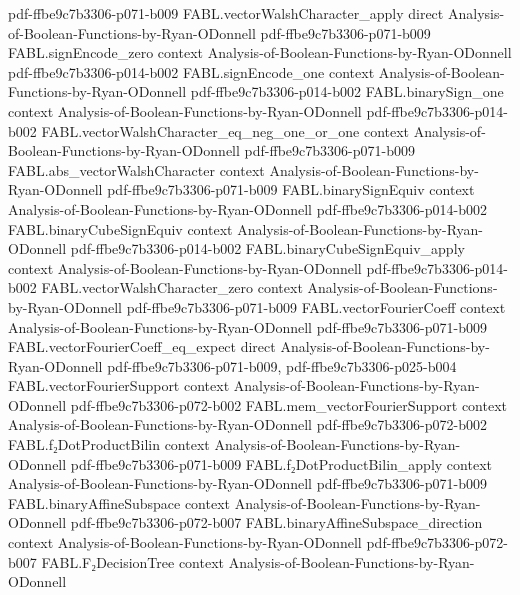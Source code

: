 \begin{theorem}
  {pdf-ffbe9c7b3306-p071-b009}
\proofstep
  {FABL.vectorWalshCharacter_apply}
  {direct}
  {Analysis-of-Boolean-Functions-by-Ryan-ODonnell}
  {pdf-ffbe9c7b3306-p071-b009}
\proofstep
  {FABL.signEncode_zero}
  {context}
  {Analysis-of-Boolean-Functions-by-Ryan-ODonnell}
  {pdf-ffbe9c7b3306-p014-b002}
\proofstep
  {FABL.signEncode_one}
  {context}
  {Analysis-of-Boolean-Functions-by-Ryan-ODonnell}
  {pdf-ffbe9c7b3306-p014-b002}
\proofstep
  {FABL.binarySign_one}
  {context}
  {Analysis-of-Boolean-Functions-by-Ryan-ODonnell}
  {pdf-ffbe9c7b3306-p014-b002}
\proofstep
  {FABL.vectorWalshCharacter_eq_neg_one_or_one}
  {context}
  {Analysis-of-Boolean-Functions-by-Ryan-ODonnell}
  {pdf-ffbe9c7b3306-p071-b009}
\proofstep
  {FABL.abs_vectorWalshCharacter}
  {context}
  {Analysis-of-Boolean-Functions-by-Ryan-ODonnell}
  {pdf-ffbe9c7b3306-p071-b009}
\proofstep
  {FABL.binarySignEquiv}
  {context}
  {Analysis-of-Boolean-Functions-by-Ryan-ODonnell}
  {pdf-ffbe9c7b3306-p014-b002}
\proofstep
  {FABL.binaryCubeSignEquiv}
  {context}
  {Analysis-of-Boolean-Functions-by-Ryan-ODonnell}
  {pdf-ffbe9c7b3306-p014-b002}
\proofstep
  {FABL.binaryCubeSignEquiv_apply}
  {context}
  {Analysis-of-Boolean-Functions-by-Ryan-ODonnell}
  {pdf-ffbe9c7b3306-p014-b002}
\proofstep
  {FABL.vectorWalshCharacter_zero}
  {context}
  {Analysis-of-Boolean-Functions-by-Ryan-ODonnell}
  {pdf-ffbe9c7b3306-p071-b009}
\proofstep
  {FABL.vectorFourierCoeff}
  {context}
  {Analysis-of-Boolean-Functions-by-Ryan-ODonnell}
  {pdf-ffbe9c7b3306-p071-b009}
\proofstep
  {FABL.vectorFourierCoeff_eq_expect}
  {direct}
  {Analysis-of-Boolean-Functions-by-Ryan-ODonnell}
  {pdf-ffbe9c7b3306-p071-b009,
    pdf-ffbe9c7b3306-p025-b004}
\proofstep
  {FABL.vectorFourierSupport}
  {context}
  {Analysis-of-Boolean-Functions-by-Ryan-ODonnell}
  {pdf-ffbe9c7b3306-p072-b002}
\proofstep
  {FABL.mem_vectorFourierSupport}
  {context}
  {Analysis-of-Boolean-Functions-by-Ryan-ODonnell}
  {pdf-ffbe9c7b3306-p072-b002}
\proofstep
  {FABL.f₂DotProductBilin}
  {context}
  {Analysis-of-Boolean-Functions-by-Ryan-ODonnell}
  {pdf-ffbe9c7b3306-p071-b009}
\proofstep
  {FABL.f₂DotProductBilin_apply}
  {context}
  {Analysis-of-Boolean-Functions-by-Ryan-ODonnell}
  {pdf-ffbe9c7b3306-p071-b009}
\proofstep
  {FABL.binaryAffineSubspace}
  {context}
  {Analysis-of-Boolean-Functions-by-Ryan-ODonnell}
  {pdf-ffbe9c7b3306-p072-b007}
\proofstep
  {FABL.binaryAffineSubspace_direction}
  {context}
  {Analysis-of-Boolean-Functions-by-Ryan-ODonnell}
  {pdf-ffbe9c7b3306-p072-b007}
\proofstep
  {FABL.F₂DecisionTree}
  {context}
  {Analysis-of-Boolean-Functions-by-Ryan-ODonnell}

\end{theorem}
